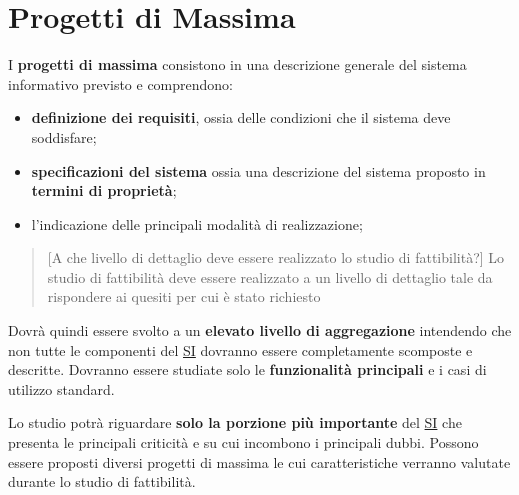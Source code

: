\section{Progetti di Massima}\label{sec:ftt_progetti_di_massima} %
I \textbf{progetti di massima} consistono in una descrizione generale del sistema informativo previsto e comprendono:
\begin{itemize}
    \item \textbf{definizione dei requisiti}, ossia delle condizioni che il sistema deve soddisfare;
    \item \textbf{specificazioni del sistema} ossia una descrizione del sistema proposto in \textbf{termini di proprietà};
    \item l'indicazione delle principali modalità di realizzazione;
\end{itemize}
\begin{quote}[A che livello di dettaglio deve essere realizzato lo studio di fattibilità?]
    Lo studio di fattibilità deve essere realizzato a un livello di dettaglio tale da rispondere ai quesiti per cui è stato richiesto
\end{quote}
Dovrà quindi essere svolto a un \textbf{elevato livello di aggregazione} intendendo che non tutte le componenti del \hyperref[sub:il_sistema_informativo]{SI} dovranno essere completamente scomposte e descritte.
Dovranno essere studiate solo le \textbf{funzionalità principali} e i casi di utilizzo standard.
\begin{note}
    Lo studio potrà riguardare \textbf{solo la porzione più importante} del \hyperref[sub:il_sistema_informativo]{SI} che presenta le principali criticità e su cui incombono i principali dubbi.
    \emptyln{}
    Possono essere proposti diversi progetti di massima le cui caratteristiche verranno valutate durante lo studio di fattibilità.
\end{note}
